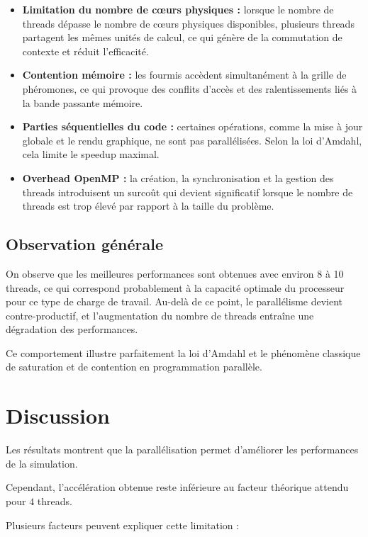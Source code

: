 \documentclass[11pt]{article}
\begin{document}
\begin{itemize}
\item \textbf{Limitation du nombre de cœurs physiques :} lorsque le nombre de threads dépasse le nombre de cœurs physiques disponibles, plusieurs threads partagent les mêmes unités de calcul, ce qui génère de la commutation de contexte et réduit l'efficacité.
\item \textbf{Contention mémoire :} les fourmis accèdent simultanément à la grille de phéromones, ce qui provoque des conflits d'accès et des ralentissements liés à la bande passante mémoire.
\item \textbf{Parties séquentielles du code :} certaines opérations, comme la mise à jour globale et le rendu graphique, ne sont pas parallélisées. Selon la loi d'Amdahl, cela limite le speedup maximal.
\item \textbf{Overhead OpenMP :} la création, la synchronisation et la gestion des threads introduisent un surcoût qui devient significatif lorsque le nombre de threads est trop élevé par rapport à la taille du problème.
\end{itemize}

\subsection{Observation générale}

On observe que les meilleures performances sont obtenues avec environ 8 à 10 threads, ce qui correspond probablement à la capacité optimale du processeur pour ce type de charge de travail.  
Au-delà de ce point, le parallélisme devient contre-productif, et l'augmentation du nombre de threads entraîne une dégradation des performances.  

Ce comportement illustre parfaitement la loi d'Amdahl et le phénomène classique de saturation et de contention en programmation parallèle.

\section{Discussion}

Les résultats montrent que la parallélisation permet d'améliorer les performances de la simulation.

Cependant, l'accélération obtenue reste inférieure au facteur théorique attendu pour $4$ threads.

Plusieurs facteurs peuvent expliquer cette limitation :
\end{document}
